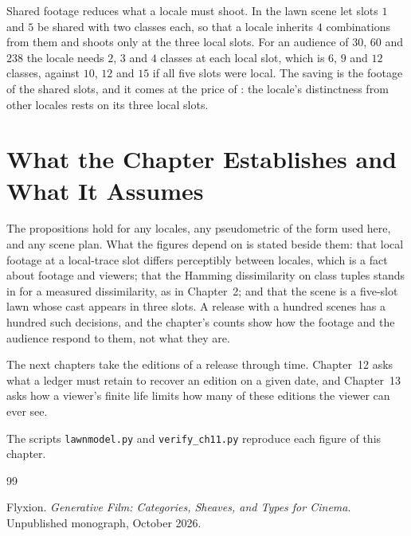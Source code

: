 \documentclass[11pt,twoside,openright]{book}
\theoremstyle{plain}
\theoremstyle{definition}
\theoremstyle{remark}
\begin{document}
Shared footage reduces what a locale must shoot. In the lawn scene let slots $1$ and $5$ be shared with two classes each, so that a locale inherits $4$ combinations from them and shoots only at the three local slots. For an audience of $30$, $60$ and $238$ the locale needs $2$, $3$ and $4$ classes at each local slot, which is $6$, $9$ and $12$ classes, against $10$, $12$ and $15$ if all five slots were local. The saving is the footage of the shared slots, and it comes at the price of : the locale's distinctness from other locales rests on its three local slots.

\section{What the Chapter Establishes and What It Assumes}\label{sec:limits11}

The propositions hold for any locales, any pseudometric of the form used here, and any scene plan. What the figures depend on is stated beside them: that local footage at a local-trace slot differs perceptibly between locales, which is a fact about footage and viewers; that the Hamming dissimilarity on class tuples stands in for a measured dissimilarity, as in Chapter~2; and that the scene is a five-slot lawn whose cast appears in three slots. A release with a hundred scenes has a hundred such decisions, and the chapter's counts show how the footage and the audience respond to them, not what they are.

The next chapters take the editions of a release through time. Chapter~12 asks what a ledger must retain to recover an edition on a given date, and Chapter~13 asks how a viewer's finite life limits how many of these editions the viewer can ever see.

The scripts \texttt{lawnmodel.py} and \texttt{verify\_ch11.py} reproduce each figure of this chapter.

\begin{thebibliography}{99}

Flyxion.
\newblock \emph{Generative Film: Categories, Sheaves, and Types for Cinema}.
\newblock Unpublished monograph, October 2026.

\end{thebibliography}
\end{document}

